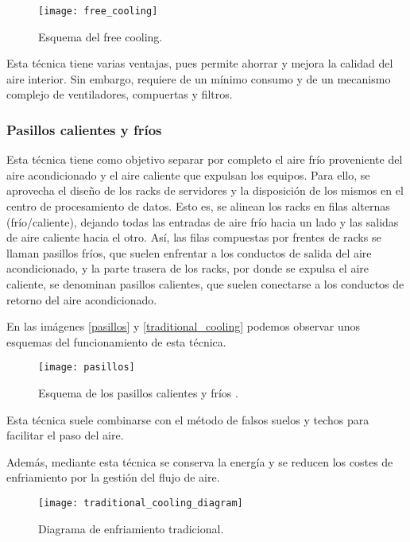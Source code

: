 \begin{figure}
    \begin{center}
        \texttt{[image: free\_cooling]}
        \caption{Esquema del free cooling.}
        \label{free_coling}
    \end{center}
\end{figure}

Esta técnica tiene varias ventajas, pues permite ahorrar y mejora la calidad del aire interior. Sin embargo, requiere de un mínimo consumo y de un mecanismo complejo de ventiladores, compuertas y filtros.

\subsubsection{Pasillos calientes y fríos}

Esta técnica tiene como objetivo separar por completo el aire frío proveniente del aire acondicionado y el aire caliente que expulsan los equipos. Para ello, se aprovecha el diseño de los racks de servidores y la disposición de los mismos en el centro de procesamiento de datos. Esto es, se alinean los racks en filas alternas (frío/caliente), dejando todas las entradas de aire frío hacia un lado y las salidas de aire caliente hacia el otro. Así, las filas compuestas por frentes de racks se llaman pasillos fríos, que suelen enfrentar a los conductos de salida del aire acondicionado, y la parte trasera de los racks, por donde se expulsa el aire caliente, se denominan pasillos calientes, que suelen conectarse a los conductos de retorno del aire acondicionado.

En las imágenes \eqref{pasillos} y \eqref{traditional_cooling} podemos observar unos esquemas del funcionamiento de esta técnica.

\begin{figure}
    \begin{center}
        \texttt{[image: pasillos]}
        \caption{Esquema de los pasillos calientes y fríos \cite{Kelvion}.}
        \label{pasillos}
    \end{center}
\end{figure}

Esta técnica suele combinarse con el método de falsos suelos y techos para facilitar el paso del aire.

Además, mediante esta técnica se conserva la energía y se reducen los costes de enfriamiento por la gestión del flujo de aire.

\begin{figure}
    \begin{center}
        \texttt{[image: traditional\_cooling\_diagram]}
        \caption{Diagrama de enfriamiento tradicional.}
        \label{traditional_cooling}
    \end{center}
\end{figure}

